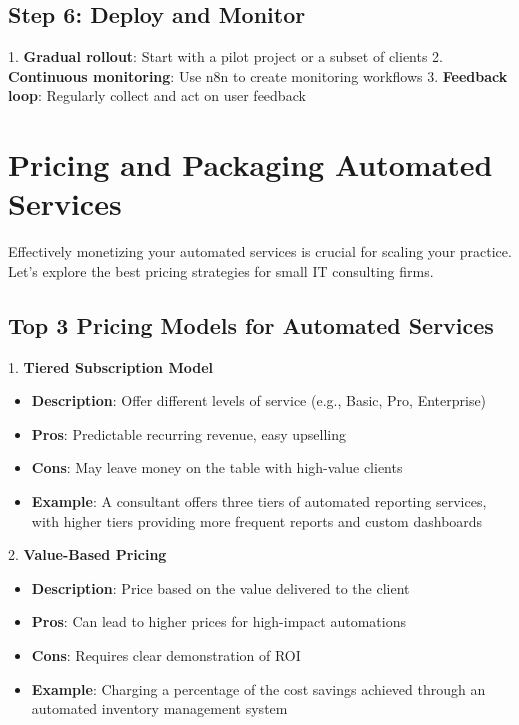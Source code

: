 \subsection{Step 6: Deploy and Monitor}

1. \textbf{Gradual rollout}: Start with a pilot project or a subset of clients
2. \textbf{Continuous monitoring}: Use n8n to create monitoring workflows
3. \textbf{Feedback loop}: Regularly collect and act on user feedback




\section{Pricing and Packaging Automated Services}

Effectively monetizing your automated services is crucial for scaling your practice. Let's explore the best pricing strategies for small IT consulting firms.

\subsection{Top 3 Pricing Models for Automated Services}

1. \textbf{Tiered Subscription Model}
\begin{itemize}
    \item \textbf{Description}: Offer different levels of service (e.g., Basic, Pro, Enterprise)
    \item \textbf{Pros}: Predictable recurring revenue, easy upselling
    \item \textbf{Cons}: May leave money on the table with high-value clients
    \item \textbf{Example}: A consultant offers three tiers of automated reporting services, with higher tiers providing more frequent reports and custom dashboards
\end{itemize}

2. \textbf{Value-Based Pricing}
\begin{itemize}
    \item \textbf{Description}: Price based on the value delivered to the client
    \item \textbf{Pros}: Can lead to higher prices for high-impact automations
    \item \textbf{Cons}: Requires clear demonstration of ROI
    \item \textbf{Example}: Charging a percentage of the cost savings achieved through an automated inventory management system
\end{itemize}

